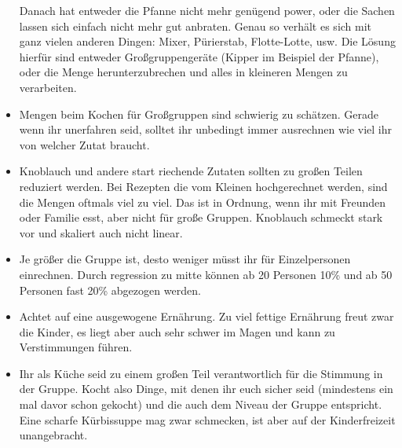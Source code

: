\begin{itemize}
    Danach hat entweder die Pfanne nicht mehr genügend power, oder die Sachen lassen sich einfach nicht mehr gut anbraten.
    Genau so verhält es sich mit ganz vielen anderen Dingen: Mixer, Pürierstab, Flotte-Lotte, usw.
    Die Lösung hierfür sind entweder Großgruppengeräte (Kipper im Beispiel der Pfanne), oder die Menge herunterzubrechen und alles in kleineren Mengen zu verarbeiten.
    \item Mengen beim Kochen für Großgruppen sind schwierig zu schätzen.
    Gerade wenn ihr unerfahren seid, solltet ihr unbedingt immer ausrechnen wie viel ihr von welcher Zutat braucht.
    \item Knoblauch und andere start riechende Zutaten sollten zu großen Teilen reduziert werden.
    Bei Rezepten die vom Kleinen hochgerechnet werden, sind die Mengen oftmals viel zu viel.
    Das ist in Ordnung, wenn ihr mit Freunden oder Familie esst, aber nicht für große Gruppen.
    Knoblauch schmeckt stark vor und skaliert auch nicht linear.
    \item Je größer die Gruppe ist, desto weniger müsst ihr für Einzelpersonen einrechnen.
    Durch regression zu mitte können ab 20 Personen 10\% und ab 50 Personen fast 20\% abgezogen werden.
    \item Achtet auf eine ausgewogene Ernährung.
    Zu viel fettige Ernährung freut zwar die Kinder, es liegt aber auch sehr schwer im Magen und kann zu Verstimmungen führen.
    \item Ihr als Küche seid zu einem großen Teil verantwortlich für die Stimmung in der Gruppe.
    Kocht also Dinge, mit denen ihr euch sicher seid (mindestens ein mal davor schon gekocht) und die auch dem Niveau der Gruppe entspricht.
    Eine scharfe Kürbissuppe mag zwar schmecken, ist aber auf der Kinderfreizeit unangebracht.
\end{itemize}

